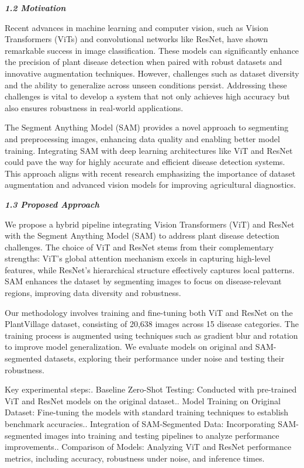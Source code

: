 \documentclass{article}
\begin{document}
\textbf{\textit{1.2 Motivation}}

Recent advances in machine learning and computer vision, such as Vision Transformers (ViTs) and convolutional networks like ResNet, have shown remarkable success in image classification. These models can significantly enhance the precision of plant disease detection when paired with robust datasets and innovative augmentation techniques. However, challenges such as dataset diversity and the ability to generalize across unseen conditions persist. Addressing these challenges is vital to develop a system that not only achieves high accuracy but also ensures robustness in real-world applications.

The Segment Anything Model (SAM) provides a novel approach to segmenting and preprocessing images, enhancing data quality and enabling better model training. Integrating SAM with deep learning architectures like ViT and ResNet could pave the way for highly accurate and efficient disease detection systems. This approach aligns with recent research emphasizing the importance of dataset augmentation and advanced vision models for improving agricultural diagnostics.



\textbf{\textit{1.3 Proposed Approach}}

We propose a hybrid pipeline integrating Vision Transformers (ViT) and ResNet with the Segment Anything Model (SAM) to address plant disease detection challenges. The choice of ViT and ResNet stems from their complementary strengths: ViT's global attention mechanism excels in capturing high-level features, while ResNet's hierarchical structure effectively captures local patterns. SAM enhances the dataset by segmenting images to focus on disease-relevant regions, improving data diversity and robustness.

Our methodology involves training and fine-tuning both ViT and ResNet on the PlantVillage dataset, consisting of 20,638 images across 15 disease categories. The training process is augmented using techniques such as gradient blur and rotation to improve model generalization. We evaluate models on original and SAM-segmented datasets, exploring their performance under noise and testing their robustness.

Key experimental steps:. Baseline Zero-Shot Testing: Conducted with pre-trained ViT and ResNet models on the original dataset.. Model Training on Original Dataset: Fine-tuning the models with standard training techniques to establish benchmark accuracies.. Integration of SAM-Segmented Data: Incorporating SAM-segmented images into training and testing pipelines to analyze performance improvements.. Comparison of Models: Analyzing ViT and ResNet performance metrics, including accuracy, robustness under noise, and inference times.\newline
\end{document}
